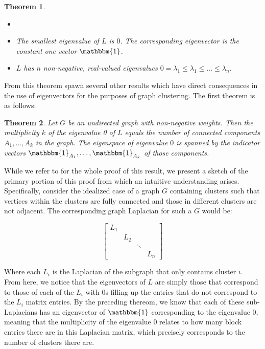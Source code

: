 \documentclass{article}
\newtheorem{theorem}{Theorem}[section]
\begin{document}
\begin{theorem}
\begin{itemize}
    \item[] \mbox{}
    \item The smallest eigenvalue of $L$ is $0$. The corresponding eigenvector is the constant one vector $\mathbbm{1}$.
    \item $L$ has $n$ non-negative, real-valued eigenvalues $0=\lambda_1\le\lambda_1\le\dots\le\lambda_n$.
\end{itemize}
\end{theorem}

From this theorem spawn several other results which have direct consequences in the use of eigenvectors for the purposes of graph clustering. The first theorem is as follows:

\begin{theorem}
Let $G$ be an undirected graph with non-negative weights. Then the multiplicity $k$ of the eigenvalue 0 of $L$ equals the number of connected components $A_1,\dots,A_k$ in the graph. The eigenspace of eigenvalue $0$ is spanned by the indicator vectors $\mathbbm{1}_{A_1},\dots,\mathbbm{1}_{A_k}$ of those components.
\end{theorem}

While we refer to \cite{spectral} for the whole proof of this result, we present a sketch of the primary portion of this proof from which an intuitive understanding arises. Specifically, consider the idealized case of a graph $G$ containing clusters such that vertices within the clusters are fully connected and those in different clusters are not adjacent. The corresponding graph Laplacian for such a $G$ would be:

\[
\begin{bmatrix}
    L_{1} &  & &  \\
    & L_{2} & &  \\
    & & \ddots &  \\
    & & & L_{n}
\end{bmatrix}
\]

Where each $L_i$ is the Laplacian of the subgraph that only contains cluster $i$. From here, we notice that the eigenvectors of $L$ are simply those that correspond to those of each of the $L_i$ with 0s filling up the entries that do not correspond to the $L_i$ matrix entries. By the preceding thereom, we know that each of these sub-Laplacians has an eigenvector of $\mathbbm{1}$ corresponding to the eigenvalue 0, meaning that the multiplicity of the eigenvalue 0 relates to how many block entries there are in this Laplacian matrix, which precisely corresponds to the number of clusters there are. 
\end{document}
